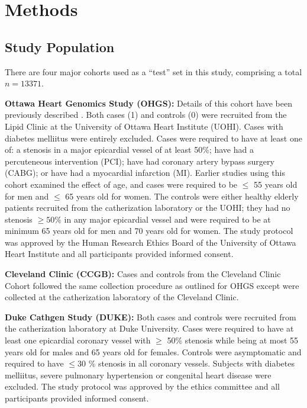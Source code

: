 \chapter{Methods}
\label{methods}


\section{Study Population}

There are four major cohorts used as a ``test''	 set in this study, comprising a total $n = 13371$.

\textbf{Ottawa Heart Genomics Study (OHGS):} Details of this cohort have been previously described \citep{Davies2012}. Both cases (1) and controls (0) were recruited from the Lipid Clinic at the University of Ottawa Heart Institute (UOHI). Cases with diabetes melliitus were entirely excluded. Cases were required to have at
least one of: a stenosis in a major epicardial vessel of at least 50\%; have had a percuteneous intervention (PCI); have had coronary artery bypass surgery (CABG); or have had a myocardial
infarction (MI). Earlier studies using this cohort examined the effect of age, and cases were required to be $\leq$ 55 years old for men and $\leq$ 65 years old for women. The controls were either healthy elderly patients recruited from the catherization laboratory or the UOHI; they had no stenosis $\geq 50\%$ in any major epicardial vessel and were required to be at minimum 65 years old for men and 70 years old for women. The study protocol was approved by the Human Research Ethics Board of the University of Ottawa Heart Institute and all participants provided informed consent.

\textbf{Cleveland Clinic (CCGB):} Cases and controls from the Cleveland Clinic Cohort followed the same collection procedure as outlined for OHGS except were collected at the catherization laboratory of the Cleveland Clinic.  


\textbf{Duke Cathgen Study (DUKE):} Both cases and controls were recruited from the catherization laboratory at Duke University. Cases were required to have at least one epicardial coronary vessel with $\geq$ 50\% stenosis while being at most 55 years old for males and 65 years old for females. Controls were asymptomatic and required to have $\leq 30$ \% stenosis in all coronary vessels. Subjects with diabetes melliitus, severe pulmonary hypertension or congenital heart disease were excluded. The study protocol was approved by the ethics committee and all participants provided informed consent.

